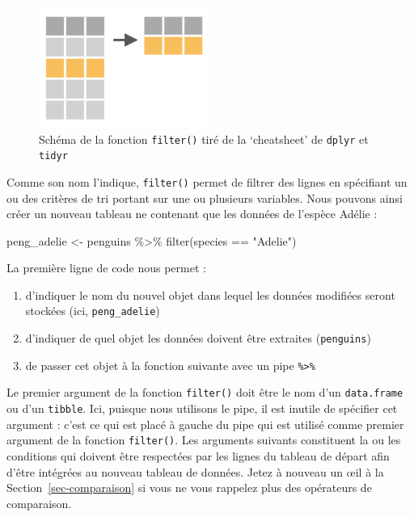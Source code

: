 \documentclass[
  letterpaper,
  DIV=11,
  numbers=noendperiod]{scrreprt}
\newenvironment{Shaded}{\begin{snugshade}}{\end{snugshade}}
\newcommand{\FunctionTok}[1]{\textcolor[rgb]{0.28,0.35,0.67}{#1}}
\newcommand{\NormalTok}[1]{\textcolor[rgb]{0.00,0.23,0.31}{#1}}
\newcommand{\OtherTok}[1]{\textcolor[rgb]{0.00,0.23,0.31}{#1}}
\newcommand{\SpecialCharTok}[1]{\textcolor[rgb]{0.37,0.37,0.37}{#1}}
\newcommand{\StringTok}[1]{\textcolor[rgb]{0.13,0.47,0.30}{#1}}
\providecommand{\tightlist}{%
  \setlength{\itemsep}{0pt}\setlength{\parskip}{0pt}}\usepackage{longtable,booktabs,array}
\begin{document}
\begin{figure}

{\centering \includegraphics[width=0.5\textwidth,height=\textheight]{./images/filter.png}

}

\caption{Schéma de la fonction \texttt{filter()} tiré de la `cheatsheet'
de \texttt{dplyr} et \texttt{tidyr}}

\end{figure}

Comme son nom l'indique, \texttt{filter()} permet de filtrer des lignes
en spécifiant un ou des critères de tri portant sur une ou plusieurs
variables. Nous pouvons ainsi créer un nouveau tableau ne contenant que
les données de l'espèce Adélie :

\begin{Shaded}
\begin{Highlighting}[]
\NormalTok{peng\_adelie }\OtherTok{\textless{}{-}}\NormalTok{ penguins }\SpecialCharTok{\%\textgreater{}\%} 
  \FunctionTok{filter}\NormalTok{(species }\SpecialCharTok{==} \StringTok{"Adelie"}\NormalTok{)}
\end{Highlighting}
\end{Shaded}

La première ligne de code nous permet :

\begin{enumerate}
\def\labelenumi{\arabic{enumi}.}
\tightlist
\item
  d'indiquer le nom du nouvel objet dans lequel les données modifiées
  seront stockées (ici, \texttt{peng\_adelie})
\item
  d'indiquer de quel objet les données doivent être extraites
  (\texttt{penguins})
\item
  de passer cet objet à la fonction suivante avec un pipe
  \texttt{\%\textgreater{}\%}
\end{enumerate}

Le premier argument de la fonction \texttt{filter()} doit être le nom
d'un \texttt{data.frame} ou d'un \texttt{tibble}. Ici, puisque nous
utilisons le pipe, il est inutile de spécifier cet argument : c'est ce
qui est placé à gauche du pipe qui est utilisé comme premier argument de
la fonction \texttt{filter()}. Les arguments suivants constituent la ou
les conditions qui doivent être respectées par les lignes du tableau de
départ afin d'être intégrées au nouveau tableau de données. Jetez à
nouveau un œil à la Section~\ref{sec-comparaison} si vous ne vous
rappelez plus des opérateurs de comparaison.
\end{document}
